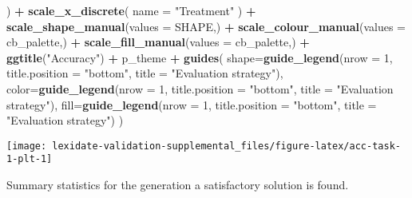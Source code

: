 \documentclass[
]{book}
\newenvironment{Shaded}{\begin{snugshade}}{\end{snugshade}}
\newcommand{\AttributeTok}[1]{\textcolor[rgb]{0.13,0.29,0.53}{#1}}
\newcommand{\DecValTok}[1]{\textcolor[rgb]{0.00,0.00,0.81}{#1}}
\newcommand{\FunctionTok}[1]{\textcolor[rgb]{0.13,0.29,0.53}{\textbf{#1}}}
\newcommand{\NormalTok}[1]{#1}
\newcommand{\SpecialCharTok}[1]{\textcolor[rgb]{0.81,0.36,0.00}{\textbf{#1}}}
\newcommand{\StringTok}[1]{\textcolor[rgb]{0.31,0.60,0.02}{#1}}
\begin{document}
\begin{Shaded}
\begin{Highlighting}[]
\NormalTok{  ) }\SpecialCharTok{+}
  \FunctionTok{scale\_x\_discrete}\NormalTok{(}
    \AttributeTok{name =} \StringTok{"Treatment"}
\NormalTok{  ) }\SpecialCharTok{+}
  \FunctionTok{scale\_shape\_manual}\NormalTok{(}\AttributeTok{values =}\NormalTok{ SHAPE,) }\SpecialCharTok{+}
  \FunctionTok{scale\_colour\_manual}\NormalTok{(}\AttributeTok{values =}\NormalTok{ cb\_palette,) }\SpecialCharTok{+}
  \FunctionTok{scale\_fill\_manual}\NormalTok{(}\AttributeTok{values =}\NormalTok{ cb\_palette,) }\SpecialCharTok{+}
  \FunctionTok{ggtitle}\NormalTok{(}\StringTok{"Accuracy"}\NormalTok{) }\SpecialCharTok{+}
\NormalTok{  p\_theme }\SpecialCharTok{+}
  \FunctionTok{guides}\NormalTok{(}
    \AttributeTok{shape=}\FunctionTok{guide\_legend}\NormalTok{(}\AttributeTok{nrow =} \DecValTok{1}\NormalTok{, }\AttributeTok{title.position =} \StringTok{"bottom"}\NormalTok{,}
                       \AttributeTok{title =} \StringTok{"Evaluation strategy"}\NormalTok{),}
    \AttributeTok{color=}\FunctionTok{guide\_legend}\NormalTok{(}\AttributeTok{nrow =} \DecValTok{1}\NormalTok{, }\AttributeTok{title.position =} \StringTok{"bottom"}\NormalTok{,}
                       \AttributeTok{title =} \StringTok{"Evaluation strategy"}\NormalTok{),}
    \AttributeTok{fill=}\FunctionTok{guide\_legend}\NormalTok{(}\AttributeTok{nrow =} \DecValTok{1}\NormalTok{, }\AttributeTok{title.position =} \StringTok{"bottom"}\NormalTok{,}
                      \AttributeTok{title =} \StringTok{"Evaluation strategy"}\NormalTok{)}
\NormalTok{  )}
\end{Highlighting}
\end{Shaded}

\texttt{[image: lexidate-validation-supplemental\_files/figure-latex/acc-task-1-plt-1]}

Summary statistics for the generation a satisfactory solution is found.
\end{document}
